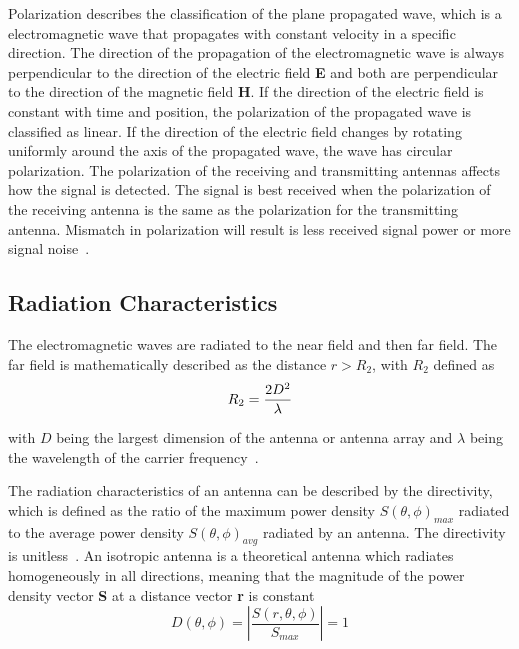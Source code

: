 Polarization describes the classification of the plane propagated wave, which is a electromagnetic wave that propagates with constant velocity in a specific direction. The direction of the propagation of the electromagnetic wave is always perpendicular to the direction of the electric field \textbf{E} and both are perpendicular to the direction of the magnetic field \textbf{H}. If the direction of the electric field is constant with time and position, the polarization of the propagated wave is classified as linear. If the direction of the electric field changes by rotating uniformly around the axis of the propagated wave, the wave has circular polarization. The polarization of the receiving and transmitting antennas affects how the signal is detected. The signal is best received when the polarization of the receiving antenna is the same as the polarization for the transmitting antenna. Mismatch in polarization will result is less received signal power or more signal noise~\cite[p. 82-84]{direct_energy}. 

\subsection{Radiation Characteristics} \label{ss:rad_char}
The electromagnetic waves are radiated to the near field and then far field. The far field is mathematically described as the distance $r>R_2$, with $R_2$ defined as
\begin{equation} \label{eq:far_field}
    R_2 = \frac{2 D^2}{\lambda}
    \tagaddtext{[\si{\meter}]}
\end{equation}

with $D$ being the largest dimension of the antenna or antenna array and $\lambda$ being the wavelength of the carrier frequency~\cite[p. 4]{ant_beam_form}.

The radiation characteristics of an antenna can be described by the directivity, which is defined as the ratio of the maximum power density $S\left( \theta, \phi \right)_{max}$ radiated to the average power density $S\left( \theta, \phi \right)_{avg}$ radiated by an antenna. The directivity is unitless~\cite[p. 63]{direct_energy}. An isotropic antenna is a theoretical antenna which radiates homogeneously in all directions, meaning that the magnitude of the power density vector \textbf{S} at a distance vector \textbf{r} is constant
\begin{equation} \label{eq:isotropic_radiation}
    D\left( \theta, \phi \right) = \left| \frac{S \left(r, \theta, \phi \right)}{S_{max}} \right|=1
\end{equation}

